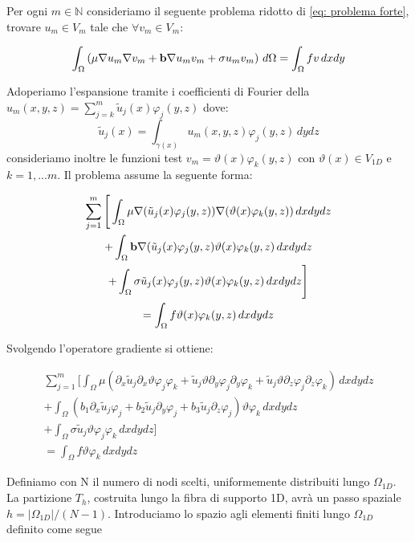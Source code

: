 Per ogni $m\in\mathbb{N}$ consideriamo il seguente problema ridotto di \eqref{eq: problema forte}, 
trovare $u_m\in V_m$ tale che $\forall v_m\in V_m$:

\begin{multline}
\int_\Omega\left(\mu\nabla u_m\nabla v_m + \mathbf{b}\nabla u_mv_m+\sigma u_mv_m\right)\,d\Omega
=\int_\Omega fv \,dxdy
\end{multline}

Adoperiamo l'espansione tramite i coefficienti di Fourier della $u_m(x,y,z)=\sum_{j=k}^m\tilde{u}_j(x)\varphi _j(y,z)$ dove:
\begin{displaymath}
\tilde{u}_j(x)=\int_{\gamma(x)}u_m(x,y,z) \varphi_j(y,z)\,dydz
\end{displaymath}
consideriamo inoltre le funzioni test $v_m=\vartheta(x)\varphi _k(y,z)$ con $\vartheta(x)\in V_{1D}$ e $k=1,...m$. Il problema assume la seguente forma:

\begin{multline}
\sum_{j=1}^m \Bigg[
\int_\Omega\mu\nabla (\tilde{u}_j(x)\varphi _j(y,z))\nabla (\vartheta(x)\varphi _k(y,z))\,dxdydz\\
+\int_\Omega\mathbf{b}\nabla (\tilde{u}_j(x)\varphi _j(y,z)\vartheta(x)\varphi _k(y,z)\,dxdydz\\
+\int_\Omega\sigma\tilde{u}_j(x)\varphi _j(y,z)\vartheta(x)\varphi _k(y,z)\,dxdydz \Bigg] \\
=\int_\Omega f\vartheta(x)\varphi _k(y,z)\,dxdydz\\
\end{multline}

Svolgendo l'operatore gradiente si ottiene:

\begin{multline}
\sum_{j=1}^m \Bigg[
\int_\Omega\mu( \partial_x\tilde{u}_j \partial_x\vartheta\varphi _j\varphi _k + \tilde{u}_j \vartheta \partial_y\varphi _j\partial_y\varphi _k + \tilde{u}_j \vartheta \partial_z\varphi _j\partial_z\varphi _k)\,dxdydz \\
+ \int_\Omega (b_1\partial_x\tilde{u}_j\varphi _j+b_2\tilde{u}_j\partial_y\varphi _j + b_3\tilde{u}_j\partial_z\varphi_j)\vartheta\varphi _k\,dxdydz\\ 
+ \int_\Omega \sigma\tilde{u}_j\vartheta\varphi _j\varphi _k\,dxdydz \Bigg]\\
=\int_\Omega f\vartheta\varphi _k\,dxdydz
\end{multline}


Definiamo con N il numero di nodi scelti, uniformemente distribuiti lungo $\Omega_{1D}$. La partizione $T_h$, costruita lungo la fibra di supporto 1D, avr\`a un passo spaziale $h=\vert \Omega_{1D}\vert / (N-1)$. Introduciamo lo spazio agli elementi finiti lungo $\Omega_{1D}$ definito come segue

